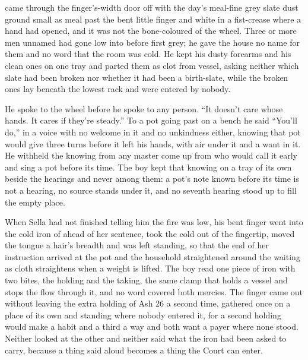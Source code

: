 \scenebreak

 came through the finger's-width door off  with the day's meal-fine grey slate dust ground small as meal past the bent little finger and white in a fist-crease where a hand had opened, and it was not the bone-coloured  of the wheel. Three or more men unnamed had gone low into  before first grey; he gave the house no name for them and no word that the room was cold. He kept his dusty forearms and his clean ones on one tray and parted them as clot from vessel, asking neither which slate had been broken nor whether it had been a birth-slate, while the broken ones lay beneath the lowest rack and were entered by nobody.

He spoke to the wheel before he spoke to any person. “It doesn't care whose hands. It cares if they're steady.” To a pot going past on a bench he said “You'll do,” in a voice with no welcome in it and no unkindness either, knowing  that pot would give three turns before it left his hands, with air under it and a want in it. He withheld the knowing from any master come up from  who would call it early and sing a pot before its time. The boy kept that knowing on a tray of its own beside the hearings and never among them: a pot's note known before its time is not a hearing, no source stands under it, and no seventh hearing stood up to fill the empty place.

When Sella had not finished telling him the fire was low, his bent finger went into the cold iron of  ahead of her sentence, took the cold out of the fingertip, moved the tongue a hair's breadth and was left standing, so that the end of her instruction arrived at the pot and the household straightened around the waiting as cloth straightens when a weight is lifted. The boy read one piece of iron with two bites, the holding and the taking, the same clamp that holds a vessel and stops the flow through it, and no  word covered both mercies. The finger came out without leaving the extra holding of Ash 26 a second time, gathered once on a place of its own and standing where nobody entered it, for a second holding would make a habit and a third a way and both want a payer where none stood. Neither looked at the other and neither said what the iron had been asked to carry, because a thing said aloud becomes a thing the Court can enter.

